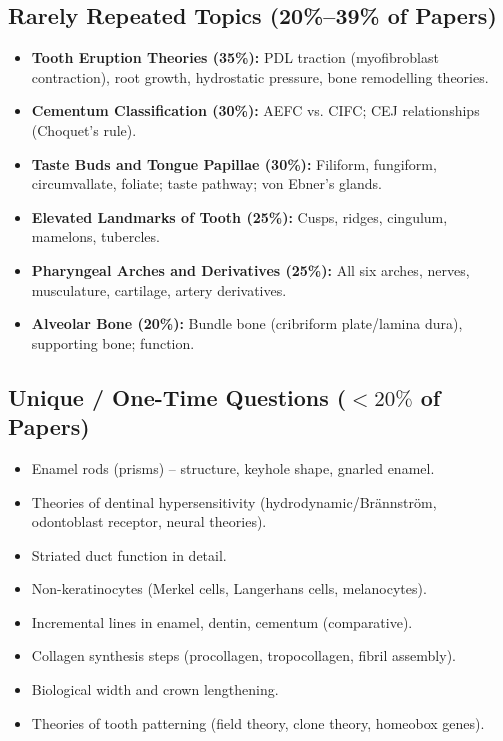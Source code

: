 \documentclass[11pt,a4paper]{article}
\begin{document}
\subsection{Rarely Repeated Topics (20\%--39\% of Papers)}
\begin{itemize}[leftmargin=*]
    \item \textbf{Tooth Eruption Theories (35\%):} PDL traction (myofibroblast contraction), root growth, hydrostatic pressure, bone remodelling theories.
    \item \textbf{Cementum Classification (30\%):} AEFC vs. CIFC; CEJ relationships (Choquet's rule).
    \item \textbf{Taste Buds and Tongue Papillae (30\%):} Filiform, fungiform, circumvallate, foliate; taste pathway; von Ebner's glands.
    \item \textbf{Elevated Landmarks of Tooth (25\%):} Cusps, ridges, cingulum, mamelons, tubercles.
    \item \textbf{Pharyngeal Arches and Derivatives (25\%):} All six arches, nerves, musculature, cartilage, artery derivatives.
    \item \textbf{Alveolar Bone (20\%):} Bundle bone (cribriform plate/lamina dura), supporting bone; function.
\end{itemize}

\subsection{Unique / One-Time Questions ($<20\%$ of Papers)}
\begin{itemize}[leftmargin=*]
    \item Enamel rods (prisms) -- structure, keyhole shape, gnarled enamel.
    \item Theories of dentinal hypersensitivity (hydrodynamic/Brännström, odontoblast receptor, neural theories).
    \item Striated duct function in detail.
    \item Non-keratinocytes (Merkel cells, Langerhans cells, melanocytes).
    \item Incremental lines in enamel, dentin, cementum (comparative).
    \item Collagen synthesis steps (procollagen, tropocollagen, fibril assembly).
    \item Biological width and crown lengthening.
    \item Theories of tooth patterning (field theory, clone theory, homeobox genes).
\end{itemize}
\end{document}
